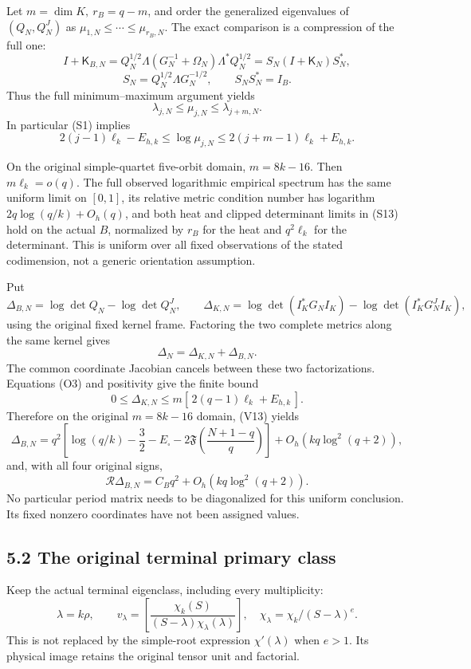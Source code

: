 Let \(m=\dim K,\ r_B=q-m\), and order the generalized eigenvalues of \((Q_N,Q_N^J)\) as \(\mu_{1,N}\le\cdots\le\mu_{r_B,N}\). The exact comparison is a compression of the full one: \[
 I+\mathsf K_{B,N}
 =Q_N^{1/2}\Lambda(G_N^{-1}+\Omega_N)\Lambda^*Q_N^{1/2}
 =S_N(I+\mathsf K_N)S_N^*,
\] \[
 S_N=Q_N^{1/2}\Lambda G_N^{-1/2},\qquad S_NS_N^*=I_B. \tag{O2}
\] Thus the full minimum--maximum argument yields \[
 \boxed{\lambda_{j,N}\le\mu_{j,N}\le\lambda_{j+m,N}.} \tag{O3}
\] In particular (S1) implies \[
 2(j-1)\ell_k-E_{h,k}
 \le\log\mu_{j,N}
 \le2(j+m-1)\ell_k+E_{h,k}. \tag{O4}
\]

On the original simple-quartet five-orbit domain, \(m=8k-16\). Then \(m\ell_k=o(q)\). The full observed logarithmic empirical spectrum has the same uniform limit on \([0,1]\), its relative metric condition number has logarithm \(2q\log(q/k)+O_h(q)\), and both heat and clipped determinant limits in (S13) hold on the actual \(B\), normalized by \(r_B\) for the heat and \(q^2\ell_k\) for the determinant. This is uniform over all fixed observations of the stated codimension, not a generic orientation assumption.

Put \[
 \Delta_{B,N}=\log\det Q_N-\log\det Q_N^J,\qquad
 \Delta_{K,N}=\log\det(I_K^*G_NI_K)-\log\det(I_K^*G_N^JI_K),
\] using the original fixed kernel frame. Factoring the two complete metrics along the same kernel gives \[
 \boxed{\Delta_N=\Delta_{K,N}+\Delta_{B,N}.} \tag{O5}
\] The common coordinate Jacobian cancels between these two factorizations. Equations (O3) and positivity give the finite bound \[
 \boxed{
 0\le\Delta_{K,N}
 \le m[\,2(q-1)\ell_k+E_{h,k}\,].
 } \tag{O6}
\] Therefore on the original \(m=8k-16\) domain, (V13) yields \[
 \boxed{
 \Delta_{B,N}
 =q^2\left[\log(q/k)-\frac32-E_\square
 -2\mathfrak F\!\left(\frac{N+1-q}{q}\right)\right]
 +O_h(kq\log^2(q+2)),
 } \tag{O7}
\] and, with all four original signs, \[
 \boxed{\mathcal R\Delta_{B,N}
 =C_Bq^2+O_h(kq\log^2(q+2)).} \tag{O8}
\] No particular period matrix needs to be diagonalized for this uniform conclusion. Its fixed nonzero coordinates have not been assigned values.

\subsection{5.2 The original terminal primary class}\label{the-original-terminal-primary-class}

Keep the actual terminal eigenclass, including every multiplicity: \[
 \lambda=k\rho,\qquad
 v_\lambda=
 \left[\frac{\chi_k(S)}
 {(S-\lambda)\chi_\lambda(\lambda)}\right],
 \quad \chi_\lambda=\chi_k/(S-\lambda)^e.
\] This is not replaced by the simple-root expression \(\chi'(\lambda)\) when \(e>1\). Its physical image retains the original tensor unit and factorial.

